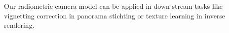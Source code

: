 Our radiometric camera model can be applied in down stream tasks like vignetting correction in panorama stichting or texture learning in inverse rendering.
